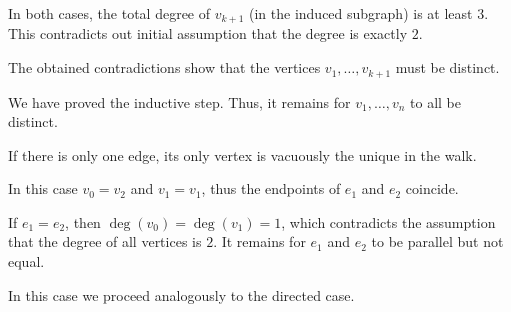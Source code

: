 \begin{defproof}
\begin{itemize}
    In both cases, the total degree of \( v_{k+1} \) (in the induced subgraph) is at least \( 3 \). This contradicts out initial assumption that the degree is exactly \( 2 \).
  \end{itemize}

  The obtained contradictions show that the vertices \( v_1, \ldots, v_{k+1} \) must be distinct.

  We have proved the inductive step. Thus, it remains for \( v_1, \ldots, v_n \) to all be distinct.

   If there is only one edge, its only vertex is vacuously the unique in the walk.

   In this case \( v_0 = v_2 \) and \( v_1 = v_1 \), thus the endpoints of \( e_1 \) and \( e_2 \) coincide.

  If \( e_1 = e_2 \), then \( \deg(v_0) = \deg(v_1) = 1 \), which contradicts the assumption that the degree of all vertices is \( 2 \). It remains for \( e_1 \) and \( e_2 \) to be parallel but not equal.

   In this case we proceed analogously to the directed case.
\end{defproof}

